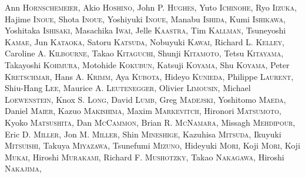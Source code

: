 {Ann \textsc{Hornschemeier},
Akio \textsc{Hoshino},
John P. \textsc{Hughes},
Yuto \textsc{Ichinohe},
Ryo \textsc{Iizuka},
Hajime \textsc{Inoue},
Shota \textsc{Inoue},
Yoshiyuki \textsc{Inoue},
Manabu \textsc{Ishida},
Kumi \textsc{Ishikawa},
Yoshitaka \textsc{Ishisaki},
Masachika \textsc{Iwai},
Jelle \textsc{Kaastra},
Tim \textsc{Kallman},
Tsuneyoshi \textsc{Kamae},
Jun \textsc{Kataoka},
Satoru \textsc{Katsuda},
Nobuyuki \textsc{Kawai},
Richard L. \textsc{Kelley},
Caroline A. \textsc{Kilbourne},
Takao \textsc{Kitaguchi},
Shunji \textsc{Kitamoto},
Tetsu \textsc{Kitayama},
Takayoshi \textsc{Kohmura},
Motohide \textsc{Kokubun},
Katsuji \textsc{Koyama},
Shu \textsc{Koyama},
Peter \textsc{Kretschmar},
Hans A. \textsc{Krimm},
Aya \textsc{Kubota},
Hideyo \textsc{Kunieda},
Philippe \textsc{Laurent},
Shiu-Hang \textsc{Lee},
Maurice A. \textsc{Leutenegger},
Olivier \textsc{Limousin},
Michael \textsc{Loewenstein},
Knox S. \textsc{Long},
David \textsc{Lumb},
Greg \textsc{Madejski},
Yoshitomo \textsc{Maeda},
Daniel \textsc{Maier},
Kazuo \textsc{Makishima},
Maxim \textsc{Markevitch},
Hironori \textsc{Matsumoto},
Kyoko \textsc{Matsushita},
Dan \textsc{McCammon},
Brian R. \textsc{McNamara},
Missagh \textsc{Mehdipour},
Eric D. \textsc{Miller},
Jon M. \textsc{Miller},
Shin \textsc{Mineshige},
Kazuhisa \textsc{Mitsuda},
Ikuyuki \textsc{Mitsuishi},
Takuya \textsc{Miyazawa},
Tsunefumi \textsc{Mizuno},
Hideyuki \textsc{Mori},
Koji \textsc{Mori},
Koji \textsc{Mukai},
Hiroshi \textsc{Murakami},
Richard F. \textsc{Mushotzky},
Takao \textsc{Nakagawa},
Hiroshi \textsc{Nakajima},
}
